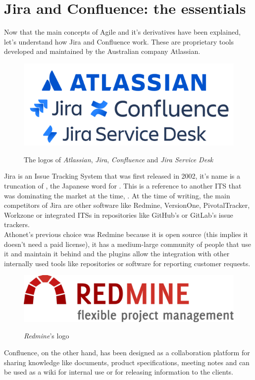 \chapter{Jira and Confluence: the essentials}
\label{chapter_4}
	Now that the main concepts of Agile and it's derivatives have been explained, let's understand how Jira and Confluence work.
	These are proprietary tools developed and maintained by the Australian company Atlassian.
	\begin{figure}[H]
		\centering
		\includegraphics[width=.7\textwidth]{resources/atlassian_logo}\\
		\caption{The logos of \textit{Atlassian}, \textit{Jira}, \textit{Confluence} and \textit{Jira Service Desk}}
	\end{figure}
	Jira is an Issue Tracking System that was first released in 2002, it's name is a truncation of , the Japanese word for .
	This is a reference to another ITS that was dominating the market at the time, .
	At the time of writing, the main competitors of Jira are other software like Redmine, VersionOne, PivotalTracker, Workzone or integrated ITSs in repositories like GitHub's or GitLab's issue trackers\cite{jira-alternatives}.\\
	Athonet's previous choice was Redmine because it is open source (this implies it doesn't need a paid license), it has a medium-large community of people that use it and maintain it behind and the plugins allow the integration with other internally used tools like repositories or software for reporting customer requests.
	\begin{figure}[H]
		\centering
		\includegraphics[width=.6\textwidth]{resources/redmine_logo}\\
		\caption{\textit{Redmine}'s logo}
	\end{figure}
	Confluence, on the other hand, has been designed as a collaboration platform for sharing knowledge like documents, product specifications, meeting notes and can be used as a wiki for internal use or for releasing information to the clients.\\
